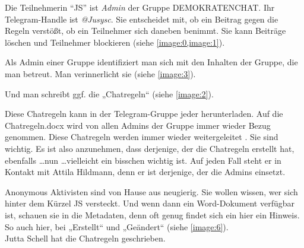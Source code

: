 Die Teilnehmerin ``{JS}'' ist \textit{Admin} der Gruppe DEMOKRATENCHAT. Ihr Telegram-Handle ist \emph{@Jusysc}. Sie entscheidet mit, ob ein Beitrag gegen die Regeln verstößt, ob ein Teilnehmer sich daneben benimmt. Sie kann Beiträge löschen und Teilnehmer blockieren (siehe \cref{image:0,image:1}).

\begin{figure}\centering  \vspace{-20pt}
  \par
  \vspace{-10pt}\caption{}\vspace{-24pt}
\end{figure}
Als Admin einer Gruppe identifiziert man sich mit den Inhalten der
Gruppe, die man betreut. Man verinnerlicht sie (siehe \cref{image:3}).

Und man schreibt ggf. die „Chatregeln“ (siehe \cref{image:2}).


Diese Chatregeln kann in der Telegram-Gruppe jeder herunterladen. Auf die Chatregeln.docx wird von allen Admins der Gruppe immer wieder Bezug genommen. Diese Chatregeln werden immer wieder weitergeleitet \autocite{Telegram:demokratenchat3:regeln}. Sie sind wichtig. Es ist also anzunehmen, dass derjenige, der die Chatregeln erstellt hat, ebenfalls \dots nun \dots vielleicht ein bisschen wichtig ist. Auf jeden Fall steht er in Kontakt mit Attila Hildmann, denn er ist derjenige, der die Admins einsetzt.

Anonymous Aktivisten sind von Hause aus neugierig. Sie wollen wissen, wer sich hinter dem Kürzel JS versteckt. Und wenn dann ein Word-Dokument verfügbar ist, schauen sie in die Metadaten, denn oft genug findet sich ein hier ein Hinweis. So auch hier, bei „Erstellt“ und „Geändert“ (siehe \cref{image:6}).\\
Jutta Schell hat die Chatregeln geschrieben.\\

